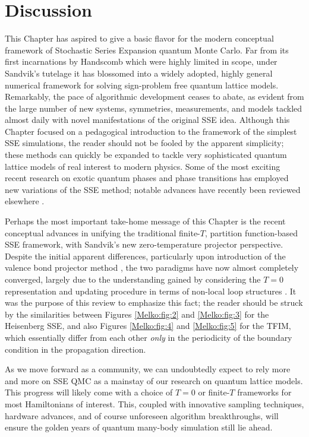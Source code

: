 \documentclass[vecphys]{svmult}
\begin{document}
\section{Discussion}

This Chapter has aspired to give a basic flavor for the modern conceptual framework of Stochastic Series Expansion quantum Monte Carlo.  Far from its first incarnations by Handscomb which were highly limited in scope, under Sandvik's tutelage it has blossomed into
a widely adopted, highly general numerical framework for solving sign-problem free quantum lattice models.  Remarkably, the pace of algorithmic development ceases to abate, as evident from the large number of new systems, symmetries, measurements, and models tackled almost daily with novel manifestations of the original SSE idea.  Although this Chapter focused on a pedagogical introduction to the framework of the simplest SSE simulations, the reader should not be fooled by the apparent simplicity;
these methods can quickly be expanded to tackle very sophisticated quantum lattice models of real interest to modern physics.  Some of the most exciting recent research on exotic quantum phases and phase transitions has employed new variations of the SSE method; notable advances have recently been reviewed elsewhere \cite{Melko:Designer}.

Perhaps the most important take-home message of this Chapter is the recent conceptual advances in unifying the traditional finite-$T$, partition function-based SSE framework, with Sandvik's new zero-temperature projector perspective.  Despite the initial apparent differences, particularly upon introduction of the valence bond projector method \cite{Melko:Sandvik05}, the two paradigms have now almost completely converged, largely due to the understanding gained by considering the $T=0$ representation and updating procedure in terms of non-local loop structures \cite{Melko:Sandvik10a}.  It was the purpose of this review to emphasize this fact; the reader should be struck by the similarities between Figures \ref{Melko:fig:2} and \ref{Melko:fig:3} for the Heisenberg SSE, and also Figures \ref{Melko:fig:4} and \ref{Melko:fig:5} for the TFIM, which essentially differ from each other {\em only} in the periodicity of the boundary condition in the propagation direction.

As we move forward as a community, we can undoubtedly expect to rely more and more on SSE QMC as a mainstay of our research on quantum lattice models.   This progress will likely come with a choice of $T=0$ or finite-$T$ frameworks for most Hamiltonians of interest.  This, coupled with innovative sampling techniques, hardware advances, and of course unforeseen algorithm breakthroughs, will ensure the golden years of quantum many-body simulation still lie ahead.
\end{document}

